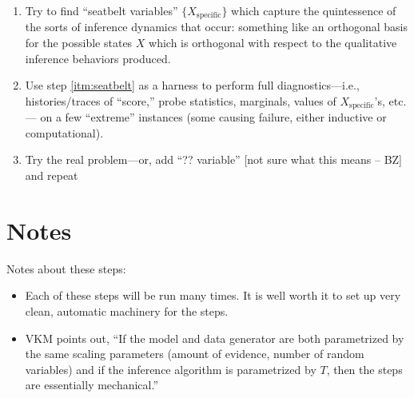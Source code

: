 \documentclass[11pt]{article}
\newcommand{\Xsp}{X_{\text{specific}}}
\begin{document}
\begin{enumerate}
  \item\label{itm:seatbelt}
    Try to find ``seatbelt variables'' $\{\Xsp\}$ which capture the quintessence
    of the sorts of inference dynamics that occur: something like an orthogonal
    basis for the possible states $X$ which is orthogonal with respect to the
    qualitative inference behaviors produced.

  \item Use step \ref{itm:seatbelt} as a harness to perform full
    diagnostics---i.e., histories/traces of ``score,'' probe statistics,
    marginals, values of $\Xsp$'s, etc.--- on a few ``extreme'' instances (some
    causing failure, either inductive or computational).

  \item Try the real problem---or, add ``?? variable'' [not sure what this means
    -- BZ] and repeat
\end{enumerate}

\section{Notes}

Notes about these steps:
\begin{itemize}
  \item Each of these steps will be run many times.  It is well worth it to set
    up very clean, automatic machinery for the steps.
  \item VKM points out, ``If the model and data generator are both parametrized
    by the same scaling parameters (amount of evidence, number of random
    variables) and if the inference algorithm is parametrized by $T$, then the
    steps are essentially mechanical.''
\end{itemize}
\end{document}
